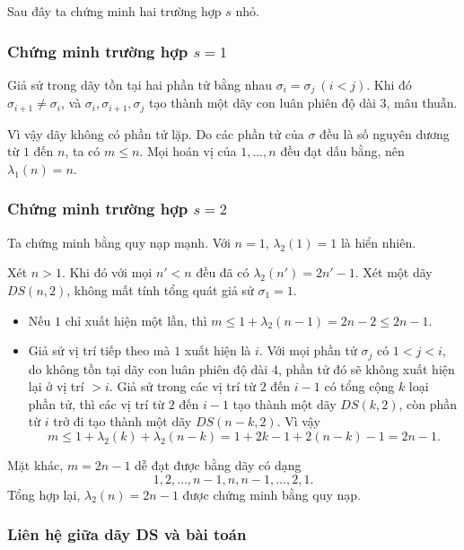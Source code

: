 \documentclass[11pt]{article}
\begin{document}
Sau đây ta chứng minh hai trường hợp \(s\) nhỏ.

\subsubsection{Chứng minh trường hợp \texorpdfstring{\(s=1\)}{s=1}}

Giả sử trong dãy tồn tại hai phần tử bằng nhau
\(\sigma_i=\sigma_j\ (i<j)\). Khi đó \(\sigma_{i+1}\ne\sigma_i\), và
\(\sigma_i,\sigma_{i+1},\sigma_j\) tạo thành một dãy con luân phiên độ dài \(3\),
mâu thuẫn.

Vì vậy dãy không có phần tử lặp. Do các phần tử của \(\sigma\) đều là số nguyên
dương từ \(1\) đến \(n\), ta có \(m\le n\). Mọi hoán vị của \(1,\ldots,n\) đều
đạt dấu bằng, nên \(\lambda_1(n)=n\).

\subsubsection{Chứng minh trường hợp \texorpdfstring{\(s=2\)}{s=2}}

Ta chứng minh bằng quy nạp mạnh. Với \(n=1\), \(\lambda_2(1)=1\) là hiển nhiên.

Xét \(n>1\). Khi đó với mọi \(n'<n\) đều đã có
\(\lambda_2(n')=2n'-1\). Xét một dãy \(DS(n,2)\), không mất tính tổng quát giả
sử \(\sigma_1=1\).

\begin{itemize}
  \item Nếu \(1\) chỉ xuất hiện một lần, thì
  \(m\le 1+\lambda_2(n-1)=2n-2\le 2n-1\).
  \item Giả sử vị trí tiếp theo mà \(1\) xuất hiện là \(i\). Với mọi phần tử
  \(\sigma_j\) có \(1<j<i\), do không tồn tại dãy con luân phiên độ dài \(4\),
  phần tử đó sẽ không xuất hiện lại ở vị trí \(>i\). Giả sử trong các vị trí từ
  \(2\) đến \(i-1\) có tổng cộng \(k\) loại phần tử, thì các vị trí từ \(2\) đến
  \(i-1\) tạo thành một dãy \(DS(k,2)\), còn phần từ \(i\) trở đi tạo thành một
  dãy \(DS(n-k,2)\). Vì vậy
  \[
    m\le 1+\lambda_2(k)+\lambda_2(n-k)
     =1+2k-1+2(n-k)-1=2n-1.
  \]
\end{itemize}

Mặt khác, \(m=2n-1\) dễ đạt được bằng dãy có dạng
\[
  1,2,\ldots,n-1,n,n-1,\ldots,2,1.
\]
Tổng hợp lại, \(\lambda_2(n)=2n-1\) được chứng minh bằng quy nạp.

\subsubsection{Liên hệ giữa dãy DS và bài toán}
\end{document}
